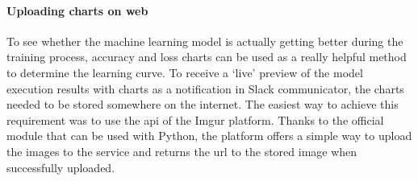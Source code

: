 \paragraph{Uploading charts on web}\label{para:charts-web-uploading}
To see whether the machine learning model is actually getting better during the training process, accuracy and loss charts can be used as a really helpful method to determine the learning curve.
To receive a `live' preview of the model execution results with charts as a notification in Slack communicator, the charts needed to be stored somewhere on the internet.
The easiest way to achieve this requirement was to use the \gls{api} of the Imgur platform.
Thanks to the official module that can be used with Python, the platform offers a simple way to upload the images to the service and returns the \gls{url} to the stored image when successfully uploaded.
